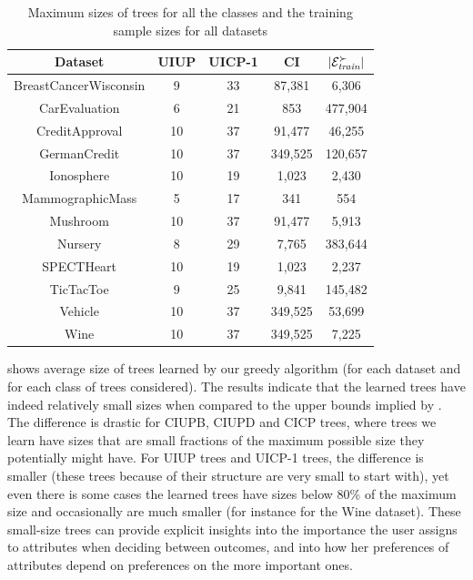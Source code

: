 \begin{table}
  \centering
  \small
  \caption{Maximum sizes of trees for all the classes and the 
					 training sample sizes for all datasets}
	\setlength\tabcolsep{6pt}
  \begin{tabular}{ |c||c|c|c|c| }
    \hline
    Dataset           & UIUP & UICP-1 & CI      & $|\mathcal{E}^\succ_{\textit{train}}|$ \\
    \hline \hline                                 
    BreastCancerWisconsin               & 9    & 33     & 87,381   & 6,306   \\ \hline
    CarEvaluation                & 6    & 21     & 853      & 477,904 \\ \hline
    CreditApproval                & 10   & 37     & 91,477   & 46,255  \\ \hline
    GermanCredit                & 10   & 37     & 349,525  & 120,657 \\ \hline
    Ionosphere                & 10   & 19     & 1,023    & 2,430   \\ \hline
    MammographicMass                & 5    & 17     & 341      & 554     \\ \hline
    Mushroom                & 10   & 37     & 91,477   & 5,913   \\ \hline
    Nursery                & 8    & 29     & 7,765    & 383,644 \\ \hline
    SPECTHeart                & 10   & 19     & 1,023    & 2,237   \\ \hline
    TicTacToe               & 9    & 25     & 9,841    & 145,482 \\ \hline
    Vehicle                & 10   & 37     & 349,525  & 53,699  \\ \hline
    Wine                & 10   & 37     & 349,525  & 7,225   \\ \hline
  \end{tabular}
  \label{tbl:trees_max_size}
\end{table}

 shows average size of trees learned by our greedy 
algorithm (for each dataset and for each class of trees considered). The
results indicate that the learned trees have indeed relatively small sizes
when compared to the upper bounds implied by . The 
difference is drastic for CIUPB, CIUPD and CICP trees, where trees we learn
have sizes that are small fractions of the maximum possible size they 
potentially might have. For UIUP trees and UICP-1 trees, the difference is 
smaller (these trees because of their structure are very small to start with),
yet even there is some cases the learned trees have sizes below 80\% of the
maximum size and occasionally are much smaller (for instance for the Wine 
dataset). These small-size trees can provide explicit insights into the 
importance the user assigns to attributes when deciding between outcomes, and 
into how her preferences of attributes depend on preferences on the more 
important ones. 

